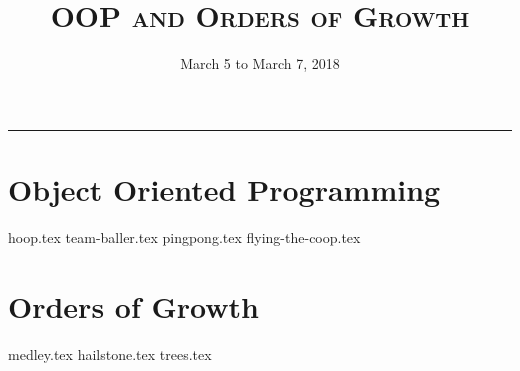 \documentclass{exam}
\title{\textsc{OOP and Orders of Growth}}
\date{March 5 to March 7, 2018}
\begin{document}
\maketitle
\rule{\textwidth}{0.15em}
\fontsize{12}{15}\selectfont

\section{Object Oriented Programming}
\begin{questions}
{hoop.tex}
{team-baller.tex}
{pingpong.tex}
{flying-the-coop.tex}
\end{questions}

\newpage
\section{Orders of Growth}
\begin{questions}
{medley.tex}
{hailstone.tex}
{trees.tex}
\end{questions}
\end{document}
